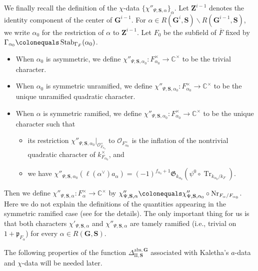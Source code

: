 \documentclass{amsart}
\newcommand{\abs}{\mathrm{abs}}
\newcommand{\mcO}{\mathcal{O}}
\newcommand{\mfp}{\mathfrak{p}}
\newcommand{\C}{\mathbb{C}}
\newcommand{\bfG}{\mathbf{G}}
\newcommand{\bfS}{\mathbf{S}}
\newcommand{\bfZ}{\mathbf{Z}}
\newcommand{\mfG}{\mathfrak{G}}
\newcommand{\II}{\mathrm{II}}
\DeclareMathOperator{\Nr}{Nr}
\DeclareMathOperator{\Stab}{Stab}
\DeclareMathOperator{\Tr}{Tr}
\theoremstyle{plain}
\theoremstyle{definition}
\theoremstyle{remark}
\theoremstyle{theorem}
\begin{document}
We finally recall the definition of the $\chi$-data $\{\chi''_{\Psi,\bfS,\alpha}\}_{\alpha}$.
Let $\bfZ^{i-1}$ denotes the identity component of the center of $\bfG^{i-1}$.
For $\alpha\in R(\bfG^{i},\bfS)\smallsetminus R(\bfG^{i-1},\bfS)$, we write $\alpha_{0}$ for the restriction of $\alpha$ to $\bfZ^{i-1}$.
Let $F_{0}$ be the subfield of $\overline{F}$ fixed by $\Gamma_{\alpha_{0}}\colonequals \Stab_{\Gamma_{F}}(\alpha_{0})$.
\begin{itemize}
\item
When $\alpha_{0}$ is asymmetric, we define $\chi''_{\Psi,\bfS,\alpha_{0}}\colon F_{\alpha_{0}}^{\times}\rightarrow\C^{\times}$ to be the trivial character.
\item
When $\alpha_{0}$ is symmetric unramified, we define $\chi''_{\Psi,\bfS,\alpha_{0}}\colon F_{\alpha_{0}}^{\times}\rightarrow\C^{\times}$ to be the unique unramified quadratic character.
\item
When $\alpha$ is symmetric ramified, we define $\chi''_{\Psi,\bfS,\alpha_{0}}\colon F_{\alpha_{0}}^{\times}\rightarrow\C^{\times}$ to be the unique character such that 
\begin{itemize}
\item
its restriction $\chi''_{\Psi,\bfS,\alpha_{0}}|_{\mcO_{F_{\alpha_{0}}}^{\times}}$ to $\mcO_{F_{\alpha_{0}}^{\times}}$ is the inflation of the nontrivial quadratic character of $k_{F_{\alpha_{0}}}^{\times}$, and
\item
we have $\chi''_{\Psi,\bfS,\alpha_{0}}(\ell(\alpha^{\vee})a_{\alpha})=(-1)^{f_{\alpha_{0}}+1}\mfG_{k_{\alpha_{0}}}(\psi^{0}\circ\Tr_{k_{\alpha_{0}}/k_{F}})$.
\end{itemize}
\end{itemize}
Then we define $\chi''_{\Psi,\bfS,\alpha}\colon F_{\alpha}^{\times}\rightarrow\C^{\times}$ by $\chi''_{\Psi,\bfS,\alpha}\colonequals \chi''_{\Psi,\bfS,\alpha_{0}}\circ\Nr_{F_{\alpha}/F_{\alpha_{0}}}$.
Here we do not explain the definitions of the quantities appearing in the symmetric ramified case (see \cite[Section 4.2]{FKS21} for the details).
The only important thing for us is that both characters $\chi'_{\Psi,\bfS,\alpha}$ and $\chi''_{\Psi,\bfS,\alpha}$ are tamely ramified (i.e., trivial on $1+\mfp_{F_{\alpha}}$) for every $\alpha\in R(\bfG,\bfS)$.

The following properties of the function $\Delta_{\II,\bfS}^{\abs,\bfG}$ associated with Kaletha's $a$-data and $\chi$-data will be needed later.
\end{document}
